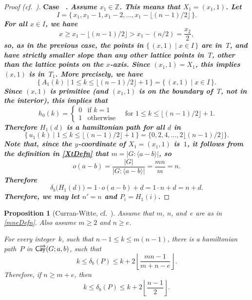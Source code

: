 \documentclass[11pt]{amsart}
\newtheorem{prop}[equation]{Proposition}
\theoremstyle{definition}
\newcounter{case}
\numberwithin{case}{startcases}
\newenvironment{case}[1][\unskip]{\refstepcounter{case}\bf
	\medskip \noindent Case \thecase\ #1. \it}{\unskip\upshape}
\renewcommand{\thecase}{\Roman{case}}
\numberwithin{equation}{section}
\newcommand{\Z}{\mathbb{Z}}  %
\newcommand{\cayd}{\mathop{\mathsf{C}\mkern-1mu\overrightarrow{\mathsf{ay}}}}
\begin{document}
\begin{proof}[Proof \textup{(cf.\ \cite[(9.2) on p.~67, and Case~3 on p.~69]{Curran})}]
		\begin{case}
			Assume $x_1 \in \Z$.
		\end{case}
		This means that $X_1 = (x_1,1)$.
		Let
		\[ I = \{\, x_1, x_1 - 1, x_1 - 2, \ldots, x_1 - \lfloor (n-1)/2 \rfloor \,\} . \]
		For all $x \in I$, we have 
		\[ x \ge x_1 - \lfloor (n-1)/2 \rfloor > x_1 - (n/2) = \frac{x_2}{2} , \]
		so, as in the previous case, the points in $\{\, (x, 1) \mid x \in I \,\}$ are in~$T$, and have strictly smaller slope than any other lattice points in~$T$, other than the lattice points on the $x$-axis. Since $(x_1,1) = X_1$, this implies $(x,1)$ is in~$T_1$. More precisely, we have
		\[ \{\, A_1(k) \mid 1 \le k \le \lfloor (n-1)/2 \rfloor + 1 \,\} = \{\, (x,1) \mid x \in I \,\} . \]
		Since $(x,1)$ is primitive (and $(x_1,1)$ is on the boundary of~$T$, not in the interior), this implies that
		\[ \displaystyle h_0(k) = 
		\begin{cases}
			0 & \text{if $k = 1$} \\
			1 & \text{otherwise}
		\end{cases}
		\quad 
		\text{for $1 \le k \le \lfloor (n-1)/2 \rfloor + 1$}
		. \]
		Therefore $H_1(d)$ is a hamiltonian path for all $d$ in
		\[ \{\, u_1(k) \mid 1 \le k \le \lfloor (n-1)/2 \rfloor + 1 \,\} = \{ 0, 2, 4, \ldots, 2 \lfloor (n-1)/2 \rfloor \} . \]
		Note that, since the $y$-coordinate of $X_1 = (x_1, 1)$ is~$1$, it follows from the definition in \cref{XtDefn} that $m = |G : \langle a - b \rangle|$, so
		\[ o(a - b) 
		= \frac{|G|}{|G : \langle a - b \rangle|}
		= \frac{mn}{m}
		= n . \]
		Therefore
		\[ \delta_b \bigl( H_1(d) \bigr)
		= 1 \cdot o(a - b) + d
		= 1 \cdot n + d
		= n + d .\]
		Therefore, we may let $n' = n$ and $P_i = H_1(i)$.
	\end{proof}
	
	\begin{prop}[Curran-Witte, cf.\ {\cite[(9.5) on p.~68]{Curran}}] \label{dgap}
		Assume that $m$, $n$, and~$e$ are as in \cref{mneDefn}. Also assume $m \ge 2$ and $n \ge e$.
		
		For every integer~$k$, such that $n - 1 \le k \le m(n-1)$, there is a hamiltonian path~$P$ in $\cayd(G; a,b)$, such that
		\[ k \le \delta_b(P) \le k + 2 \left\lfloor \frac{mn - 1}{m + n - e} \right\rfloor . \]
		Therefore, if $n \ge m + e$, then 
		\[ k \le \delta_b(P) \le k + 2 \left\lfloor \frac{n - 1}{2} \right\rfloor. \]
	\end{prop}
	
\end{document}
